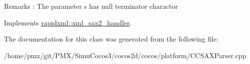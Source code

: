 \begin{DoxyRemark}{Remarks}
\+: The parameter \textquotesingle{}s\textquotesingle{} has null terminator charactor 
\end{DoxyRemark}


Implements \hyperlink{classrapidxml_1_1xml__sax2__handler_a184f17acd823b4947f7cd4cfe4e89ae4}{rapidxml\+::xml\+\_\+sax2\+\_\+handler}.



The documentation for this class was generated from the following file\+:\begin{DoxyCompactItemize}
\item 
/home/pmx/git/\+P\+M\+X/\+Simu\+Cocos3/cocos2d/cocos/platform/C\+C\+S\+A\+X\+Parser.\+cpp\end{DoxyCompactItemize}
